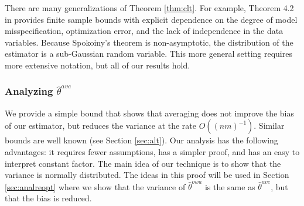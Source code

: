 \documentclass[twoside]{article}
\newcommand{\w}{\theta}
\newcommand{\wreopt}{\hat\w^{owa}}
\newcommand{\wave}{\hat\w^{ave}}
\begin{document}
There are many generalizations of Theorem \ref{thm:clt}.
For example, Theorem 4.2 in \cite{spokoiny2012parametricestimation} provides finite sample bounds with explicit dependence on the degree of model misspecification, optimization error, and the lack of independence in the data variables.
Because Spokoiny's theorem is non-asymptotic,
the distribution of the estimator is a sub-Gaussian random variable.
This more general setting requires more extensive notation,
but all of our results hold.

\subsubsection{Analyzing $\wave$}

We provide a simple bound that shows that averaging does not improve the bias of our estimator,
but reduces the variance at the rate $O((nm)^{-1})$.
Similar bounds are well known (see Section \ref{sec:alt}).
Our analysis has the following advantages:
it requires fewer assumptions, has a simpler proof, and has an easy to interpret constant factor.
The main idea of our technique is to show that the variance is normally distributed.
The ideas in this proof will be used in Section \ref{sec:analreopt} where we show that the variance of $\wreopt$ is the same as $\wave$, but that the bias is reduced.
\end{document}
